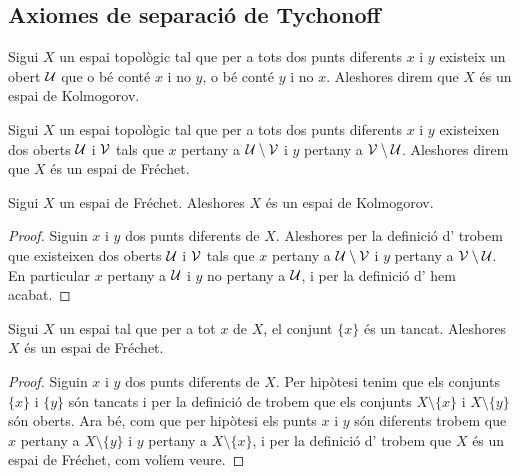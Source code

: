 \documentclass[../../Main.tex]{subfiles}
\begin{document}
	\subsection{Axiomes de separació de Tychonoff}
	\begin{definition}
		\label{def:espai de Kolmogorov}
		Sigui \(X\) un espai topològic tal que per a tots dos punts diferents \(x\) i \(y\) existeix un obert \(\mathcal{U}\) que o bé conté \(x\) i no \(y\), o bé conté \(y\) i no \(x\). Aleshores direm que \(X\) és un espai de Kolmogorov.
	\end{definition}
	\begin{definition}
		\label{def:espai de Fréchet}
		Sigui \(X\) un espai topològic tal que per a tots dos punts diferents \(x\) i \(y\) existeixen dos oberts \(\mathcal{U}\) i \(\mathcal{V}\) tals que \(x\) pertany a \(\mathcal{U}\setminus\mathcal{V}\) i \(y\) pertany a \(\mathcal{V}\setminus\mathcal{U}\). Aleshores direm que \(X\) és un espai de Fréchet.
	\end{definition}
	\begin{proposition}
		\label{prop:els espais de Fréchet són de Kolmogorov}
		Sigui \(X\) un espai de Fréchet. Aleshores \(X\) és un espai de Kolmogorov.
		\begin{proof}
			Siguin \(x\) i \(y\) dos punts diferents de \(X\). Aleshores per la definició d' trobem que existeixen dos oberts \(\mathcal{U}\) i \(\mathcal{V}\) tals que \(x\) pertany a \(\mathcal{U}\setminus\mathcal{V}\) i \(y\) pertany a \(\mathcal{V}\setminus\mathcal{U}\). En particular \(x\) pertany a \(\mathcal{U}\) i \(y\) no pertany a \(\mathcal{U}\), i per la definició d' hem acabat.
		\end{proof}
	\end{proposition}
	\begin{proposition}
		\label{prop:si en un espai topològic tots els punts són tancats aquest és Fréchet}
		Sigui \(X\) un espai tal que per a tot \(x\) de \(X\), el conjunt \(\{x\}\) és un tancat. Aleshores \(X\) és un espai de Fréchet.
		\begin{proof}
			Siguin \(x\) i \(y\) dos punts diferents de \(X\). Per hipòtesi tenim que els conjunts \(\{x\}\) i \(\{y\}\) són tancats i per la definició de  trobem que els conjunts \(X\setminus\{x\}\) i \(X\setminus\{y\}\) són oberts. Ara bé, com que per hipòtesi els punts \(x\) i \(y\) són diferents trobem que \(x\) pertany a \(X\setminus\{y\}\) i \(y\) pertany a \(X\setminus\{x\}\), i per la definició d' trobem que \(X\) és un espai de Fréchet, com volíem veure.
		\end{proof}
	\end{proposition}
\end{document}
